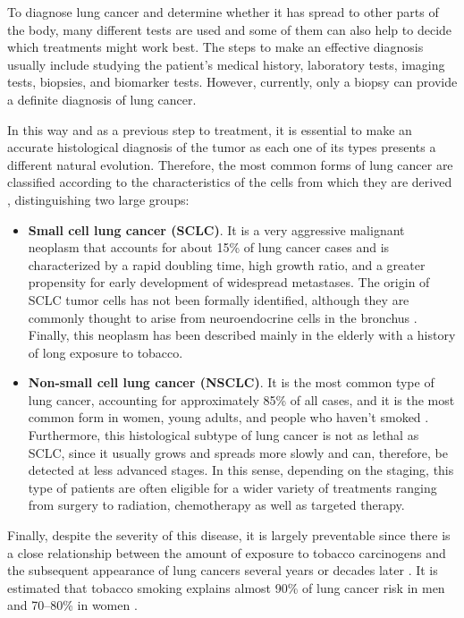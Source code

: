 To diagnose lung cancer and determine whether it has spread to other parts of the body, many different tests are used and some of them can also help to decide which treatments might work best. The steps to make an effective diagnosis usually include studying the patient's medical history, laboratory tests, imaging tests, biopsies, and biomarker tests. However, currently, only a biopsy can provide a definite diagnosis of lung cancer.

In this way and as a previous step to treatment, it is essential to make an accurate histological diagnosis of the tumor as each one of its types presents a different natural evolution. Therefore, the most common forms of lung cancer are classified according to the characteristics of the cells from which they are derived \cite{WHO}, distinguishing two large groups:
\begin{itemize}
    \item \textbf{Small cell lung cancer (SCLC)}. It is a very aggressive malignant neoplasm that accounts for about 15\% of lung cancer cases \cite{SCLC} and is characterized by a rapid doubling time, high growth ratio, and a greater propensity for early development of widespread metastases. The origin of SCLC tumor cells has not been formally identified, although they are commonly thought to arise from neuroendocrine cells in the bronchus \cite{SCLC_cell_orig}. Finally, this neoplasm has been described mainly in the elderly with a history of long exposure to tobacco.
    \item \textbf{Non-small cell lung cancer (NSCLC)}. It is the most common type of lung cancer, accounting for approximately 85\% of all cases, and it is the most common form in women, young adults, and people who haven't smoked \cite{NSCLC}. Furthermore, this histological subtype of lung cancer is not as lethal as SCLC, since it usually grows and spreads more slowly and can, therefore, be detected at less advanced stages. In this sense, depending on the staging, this type of patients are often eligible for a wider variety of treatments ranging from surgery to radiation, chemotherapy as well as targeted therapy.
\end{itemize}

Finally, despite the severity of this disease, it is largely preventable since there is a close relationship between the amount of exposure to tobacco carcinogens and the subsequent appearance of lung cancers several years or decades later \cite{Tobacco}. It is estimated that tobacco smoking explains almost 90\% of lung cancer risk in men and 70–80\% in women \cite{Smoking}.


